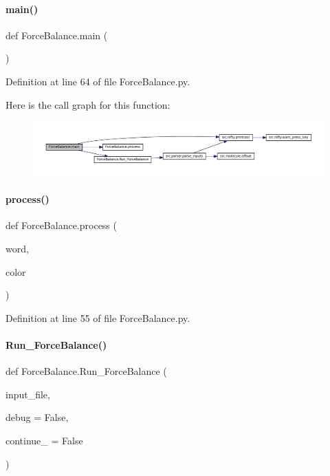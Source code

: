 \paragraph{\texorpdfstring{main()}{main()}}
{\footnotesize\ttfamily def Force\+Balance.\+main (\begin{DoxyParamCaption}{ }\end{DoxyParamCaption})}



Definition at line 64 of file Force\+Balance.\+py.

Here is the call graph for this function\+:
\nopagebreak
\begin{figure}[H]
\begin{center}
\leavevmode
\includegraphics[width=350pt]{namespaceForceBalance_a4ae50d1240ec44e372982a19bd9be35e_cgraph}
\end{center}
\end{figure}
\mbox{\label{namespaceForceBalance_aeface9fd43380d545db733e53e828485}} 
\paragraph{\texorpdfstring{process()}{process()}}
{\footnotesize\ttfamily def Force\+Balance.\+process (\begin{DoxyParamCaption}\item[{}]{word,  }\item[{}]{color }\end{DoxyParamCaption})}



Definition at line 55 of file Force\+Balance.\+py.

\mbox{\label{namespaceForceBalance_ab2b0185becf32b01adf8af885ad10345}} 
\paragraph{\texorpdfstring{Run\+\_\+\+Force\+Balance()}{Run\_ForceBalance()}}
{\footnotesize\ttfamily def Force\+Balance.\+Run\+\_\+\+Force\+Balance (\begin{DoxyParamCaption}\item[{}]{input\+\_\+file,  }\item[{}]{debug = {\ttfamily False},  }\item[{}]{continue\+\_\+ = {\ttfamily False} }\end{DoxyParamCaption})}




